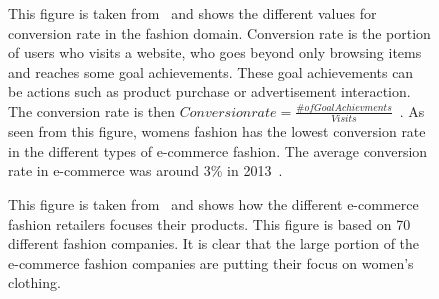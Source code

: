   \begin{figure}[H]
      \centering

      \caption[Conversion Rate in Fashion Retail]{This figure is taken from~\cite{Jorij2012} and shows the different values for conversion rate in the fashion domain.
      Conversion rate is the portion of users who visits a website, who goes beyond only browsing items and reaches some goal achievements.
      These goal achievements can be actions such as product purchase or advertisement interaction.
      The conversion rate is then $Conversion rate = \frac{\# of Goal Achievments}{Visits}$~\cite{nielsen2013}.
      As seen from this figure, womens fashion has the lowest conversion rate in the different types of e-commerce fashion.
      The average conversion rate in e-commerce was around 3\% in 2013~\cite{nielsen2013}.
      }
  \end{figure}



  \begin{figure}[H]
    \caption[E-commerce benchmark and Fashion]{This figure is taken from~\cite{Jorij2012} and shows how the different e-commerce fashion retailers focuses their products.
    This figure is based on 70 different fashion companies.
    It is clear that the large portion of the e-commerce fashion companies are putting their focus on women's clothing.}
  \end{figure}

